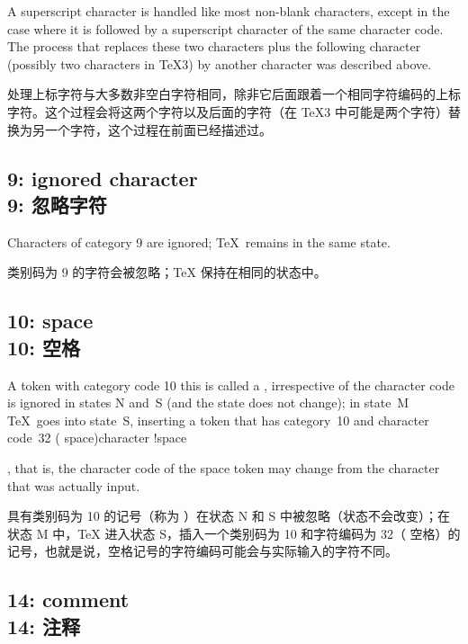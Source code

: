 A superscript character is handled like most non-blank
characters, except in the case where it is followed
by a  superscript character of the same character code.
The process
that replaces these two characters plus the following character
(possibly two characters in \TeX3) by another character
was described above.

处理上标字符与大多数非空白字符相同，除非它后面跟着一个相同字符编码的上标字符。这个过程会将这两个字符以及后面的字符（在 \TeX3 中可能是两个字符）替换为另一个字符，这个过程在前面已经描述过。



\subsection{9: ignored character\\9: 忽略字符}

Characters of category 9 are ignored; \TeX\ remains in the same state.

类别码为 9 的字符会被忽略；\TeX{} 保持在相同的状态中。


\subsection{10: space\\10: 空格}

A token with category code 10 \ldash this is called a ,
irrespective of the character code \rdash 
is ignored in states {\italic N} and~{\italic S} 
(and the state does not change); 
in state~{\italic M} \TeX\ goes into state~{\italic S}, inserting
a token that has category~10 and character code~32 
(\ascii{} space)\term character !space\par,
that is, the character code of the space token may change
from the character that was actually input.

具有类别码为 10 的记号（称为 ）在状态 {\italic N} 和 {\italic S} 中被忽略（状态不会改变）；在状态 {\italic M} 中，\TeX{} 进入状态 {\italic S}，插入一个类别码为 10 和字符编码为 32（\ascii{} 空格）的记号，也就是说，空格记号的字符编码可能会与实际输入的字符不同。


\subsection{14: comment\\14: 注释}

